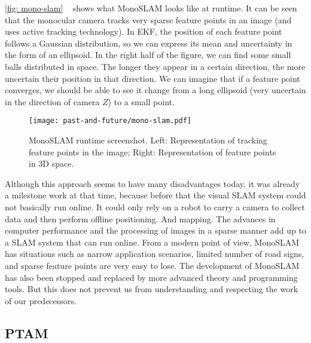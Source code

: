 \autoref{fig: mono-slam} ~ shows what MonoSLAM looks like at runtime. It can be seen that the monocular camera tracks very sparse feature points in an image (and uses active tracking technology). In EKF, the position of each feature point follows a Gaussian distribution, so we can express its mean and uncertainty in the form of an ellipsoid. In the right half of the figure, we can find some small balls distributed in space. The longer they appear in a certain direction, the more uncertain their position in that direction. We can imagine that if a feature point converges, we should be able to see it change from a long ellipsoid (very uncertain in the direction of camera $ Z $) to a small point.

\begin{figure}[! htp]
\centering
\texttt{[image: past-and-future/mono-slam.pdf]}
\caption{MonoSLAM runtime screenshot. Left: Representation of tracking feature points in the image; Right: Representation of feature points in 3D space. }
\label{fig: mono-slam}
\end{figure}

Although this approach seems to have many disadvantages today, it was already a milestone work at that time, because before that the visual SLAM system could not basically run online. It could only rely on a robot to carry a camera to collect data and then perform offline positioning. And mapping. The advances in computer performance and the processing of images in a sparse manner add up to a SLAM system that can run online. From a modern point of view, MonoSLAM has situations such as narrow application scenarios, limited number of road signs, and sparse feature points are very easy to lose. The development of MonoSLAM has also been stopped and replaced by more advanced theory and programming tools. But this does not prevent us from understanding and respecting the work of our predecessors.

\subsection{PTAM}

